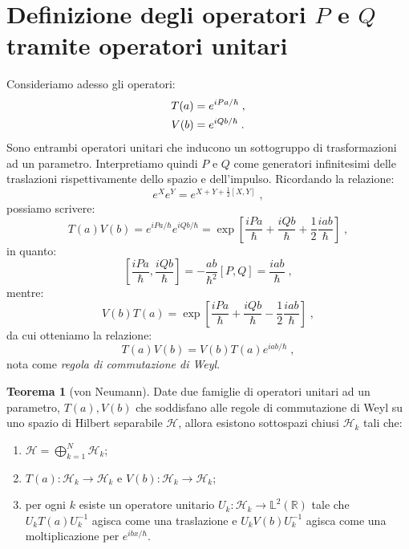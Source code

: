 \documentclass[12pt,a4paper]{report}
\theoremstyle{definition}
\newtheorem{thm}{Teorema}[section]
\newcommand{\ham}{\mathcal{H}}
\numberwithin{equation}{section}
\begin{document}
\section{Definizione degli operatori $P$ e $Q$ tramite operatori unitari}
Consideriamo adesso gli operatori:
\begin{align}
T(a)&=e^{iPa/\hbar}\;, \notag \\
V(b)&=e^{iQb/\hbar}\;.
\end{align}
Sono entrambi operatori unitari che inducono un sottogruppo di trasformazioni ad un parametro. Interpretiamo quindi $P$ e $Q$ come generatori infinitesimi delle traslazioni rispettivamente dello spazio e dell'impulso. Ricordando la relazione:
\begin{equation}
e^Xe^Y=e^{X+Y+\frac{1}{2}[X,Y]}\;,
\end{equation}
possiamo scrivere:
\begin{equation}
T(a)V(b)=e^{iPa/\hbar}e^{iQb/\hbar}=\exp\left[\frac{iPa}{\hbar}+\frac{iQb}{\hbar}+\frac{1}{2}\frac{iab}{\hbar}\right]\;,
\end{equation}
in quanto:
\begin{equation}
\left[\frac{iPa}{\hbar},\frac{iQb}{\hbar}\right]=-\frac{ab}{\hbar^2}[P,Q]=\frac{iab}{\hbar}\;,
\end{equation}
mentre:
\begin{equation}
V(b)T(a)=\exp\left[\frac{iPa}{\hbar}+\frac{iQb}{\hbar}-\frac{1}{2}\frac{iab}{\hbar}\right]\;,
\end{equation}
da cui otteniamo la relazione:
\begin{equation}
T(a)V(b)=V(b)T(a)e^{iab/\hbar}\;,
\end{equation}
nota come \textit{regola di commutazione di Weyl}.
\begin{thm}[von Neumann] Date due famiglie di operatori unitari ad un parametro, $T(a),V(b)$ che soddisfano alle regole di commutazione di Weyl su uno spazio di Hilbert separabile $\ham$, allora esistono sottospazi chiusi $\ham_k$ tali che:
\begin{enumerate}
\item $\ham=\bigoplus_{k=1}^N \ham_k$;
\item $T(a):\ham_k\to\ham_k$ e $V(b):\ham_k\to\ham_k$;
\item per ogni $k$ esiste un operatore unitario $U_k:\ham_k\to\mathbb{L}^2(\mathbb{R})$ tale che $U_kT(a)U_k^{-1}$ agisca come una traslazione e $U_kV(b)U_k^{-1}$ agisca come una moltiplicazione per $e^{ibx/\hbar}$.
\end{enumerate}
\end{thm}
\end{document}
